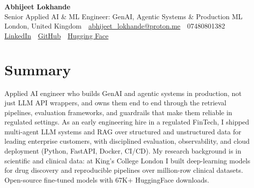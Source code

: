 \documentclass[10pt,a4paper]{article}
\newcommand{\sep}{\,\textcolor{accent!60}{\textbar}\,}
\begin{document}
\begin{center}
  {\fontsize{24}{26}\selectfont\bfseries Abhijeet Lokhande}\\[3pt]
  {\color{accent}\large Senior Applied AI \& ML Engineer: GenAI, Agentic Systems \& Production ML}\\[5pt]
  {\small
    London, United Kingdom \sep
    \href{mailto:abhijeet_lokhande@proton.me}{abhijeet\_lokhande@proton.me} \sep
    07480801382 \\[2pt]
    \href{https://www.linkedin.com/in/ablds/}{LinkedIn} \sep
    \href{https://github.com/abhijeetscode}{GitHub} \sep
    \href{https://huggingface.co/ab-ai}{Hugging Face}
  }
\end{center}
\vspace{2pt}

\section{Summary}
Applied AI engineer who builds GenAI and agentic systems in production, not just LLM API wrappers, and owns them end to end through the retrieval pipelines, evaluation frameworks, and guardrails that make them reliable in regulated settings. As an early engineering hire in a regulated FinTech, I shipped multi-agent LLM systems and RAG over structured and unstructured data for leading enterprise customers, with disciplined evaluation, observability, and cloud deployment (Python, FastAPI, Docker, CI/CD). My research background is in scientific and clinical data: at King's College London I built deep-learning models for drug discovery and reproducible pipelines over million-row clinical datasets. Open-source fine-tuned models with 67K+ HuggingFace downloads.

\end{document}
